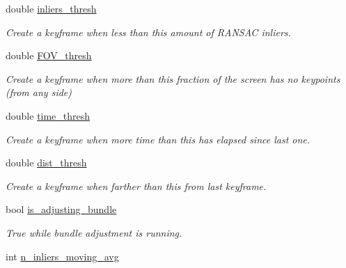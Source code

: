 \begin{DoxyCompactItemize}
\mbox{\label{classMap_af5695f2e241107aa812cc5c1826fef37}} 
double \hyperlink{classMap_af5695f2e241107aa812cc5c1826fef37}{inliers\+\_\+thresh}
\begin{DoxyCompactList}\small\item\em Create a keyframe when less than this amount of R\+A\+N\+S\+AC inliers. \end{DoxyCompactList}\item 
\mbox{\label{classMap_a35fc2ab0486f0f82512c0eb6bf4b1ccd}} 
double \hyperlink{classMap_a35fc2ab0486f0f82512c0eb6bf4b1ccd}{F\+O\+V\+\_\+thresh}
\begin{DoxyCompactList}\small\item\em Create a keyframe when more than this fraction of the screen has no keypoints (from any side) \end{DoxyCompactList}\item 
\mbox{\label{classMap_a57996d0d3379ead3e4e7877db836ef33}} 
double \hyperlink{classMap_a57996d0d3379ead3e4e7877db836ef33}{time\+\_\+thresh}
\begin{DoxyCompactList}\small\item\em Create a keyframe when more time than this has elapsed since last one. \end{DoxyCompactList}\item 
\mbox{\label{classMap_afc0703cae7e706c952f45685a74d0626}} 
double \hyperlink{classMap_afc0703cae7e706c952f45685a74d0626}{dist\+\_\+thresh}
\begin{DoxyCompactList}\small\item\em Create a keyframe when farther than this from last keyframe. \end{DoxyCompactList}\item 
\mbox{\label{classMap_a42aaec155f0d5f18aeda45a0bebb5d71}} 
bool \hyperlink{classMap_a42aaec155f0d5f18aeda45a0bebb5d71}{is\+\_\+adjusting\+\_\+bundle}
\begin{DoxyCompactList}\small\item\em True while bundle adjustment is running. \end{DoxyCompactList}\item 
\mbox{\label{classMap_af5a5af988716e8be41c5129fff01d73a}} 
int \hyperlink{classMap_af5a5af988716e8be41c5129fff01d73a}{n\+\_\+inliers\+\_\+moving\+\_\+avg}

\end{DoxyCompactItemize}
